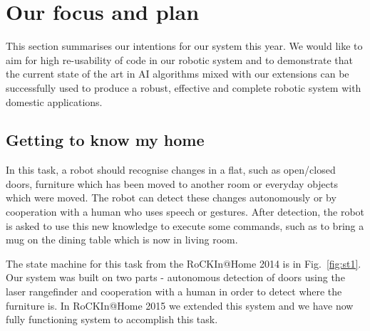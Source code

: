  
\section{Our focus and plan}

This section summarises our intentions for our system this year. We would like to aim for high re-usability of code in our robotic system and to demonstrate that the current state of the art in AI algorithms mixed with our extensions can be successfully used to produce a robust, effective and complete robotic system with domestic applications.  

%
%


\subsection{Getting to know my home}

In this task, a robot should recognise changes in a flat, such as open/closed doors, furniture which has been moved to another room or everyday objects which were moved. 
The robot can detect these changes autonomously or by cooperation with a human who uses speech or gestures.
After detection, the robot is asked to use this new knowledge to execute some commands, such as to bring a mug on the dining table which is now in living room.

The state machine for this task from the RoCKIn@Home 2014 is in Fig.~\ref{fig:st1}.
Our system was built on two parts - autonomous detection of doors using the laser rangefinder and cooperation with a human in order to detect where the furniture is. 
In RoCKIn@Home 2015 we extended this system and we have now fully functioning system to accomplish this task.


